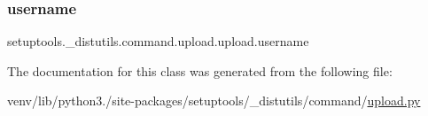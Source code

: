 \mbox{\label{classsetuptools_1_1__distutils_1_1command_1_1upload_1_1upload_ad368d4b122b82c0a82ab07d64a2e8b32}} 
\subsubsection{\texorpdfstring{username}{username}}
{\footnotesize\ttfamily setuptools.\+\_\+distutils.\+command.\+upload.\+upload.\+username}



The documentation for this class was generated from the following file\+:\begin{DoxyCompactItemize}
\item 
venv/lib/python3./site-\/packages/setuptools/\+\_\+distutils/command/\hyperlink{__distutils_2command_2upload_8py}{upload.\+py}\end{DoxyCompactItemize}
